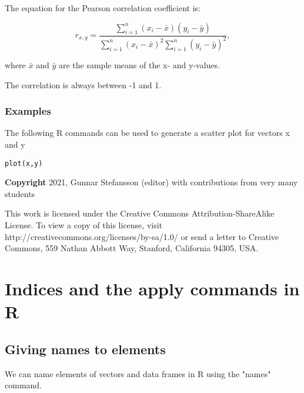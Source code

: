 \documentclass[12pt,a4paper]{article}
\theoremstyle{regla}
\theoremstyle{remark}
\theoremstyle{definition}
\theoremstyle{nonumberbreak}
\begin{document}
The equation for the Pearson correlation coefficient is:  


$$
r_{x,y} = \frac{\sum_{i=1}^{n}(x_i - \bar{x})(y_i - \bar{y})}{\sum_{i=1}^{n}(x_i - \bar{x})^2\sum_{i=1}^{n}(y_i - \bar{y})^2}, 
$$

where $\bar{x}$ and $\bar{y}$ are the sample means of the x- and y-values.

The correlation is always between -1 and 1. 

\subsubsection{Examples}
The following R commands can be used to generate a scatter plot for vectors x and y
\begin{xmpl}
\begin{lstlisting}
plot(x,y) 
\end{lstlisting}
\end{xmpl}

{\bf Copyright}
2021, Gunnar Stefansson (editor) with contributions from very many students

This work is licensed under the Creative Commons
Attribution-ShareAlike License. To view a copy of this license, visit
http://creativecommons.org/licenses/by-sa/1.0/ or send a letter to
Creative Commons, 559 Nathan Abbott Way, Stanford, California 94305,
USA.
\clearpage
\section{Indices and the apply commands in R}
\subsection{Giving names to elements}
\begin{fbox}
\begin{minipage}{0.97\textwidth}
We can name elements of vectors and data frames in R using the "names" command.




\end{minipage}
\end{fbox}
\end{document}
